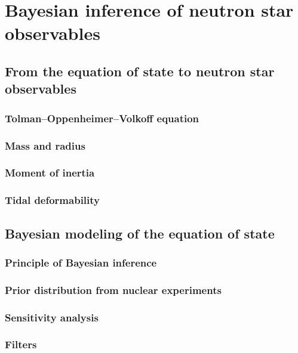 \chapter{Bayesian inference of neutron star observables}

\section{From the equation of state to neutron star observables}

\subsection{Tolman–Oppenheimer–Volkoff equation}

\subsection{Mass and radius}

\subsection{Moment of inertia}

\subsection{Tidal deformability}

\section{Bayesian modeling of the equation of state}

\subsection{Principle of Bayesian inference}

\subsection{Prior distribution from nuclear experiments}

\subsection{Sensitivity analysis}

\subsection{Filters}

